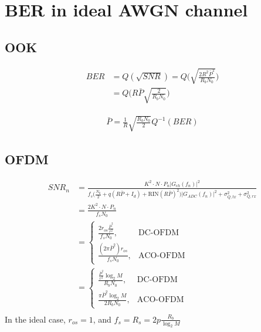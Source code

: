 \documentclass[a4paper]{article}
\begin{document}
\section{BER in ideal AWGN channel}

\subsection{OOK}

\begin{align} \nonumber
BER & = Q(\sqrt{SNR}) = Q\bigg(\sqrt{\frac{2R^2\bar{P}^2}{R_bN_0}}\bigg) \\
&= Q\bigg(R\bar{P}\sqrt{\frac{2}{R_bN_0}}\bigg)
\end{align}


\begin{align}
\bar{P} = \frac{1}{R}\sqrt{\frac{R_bN_0}{2}}Q^{-1}(BER)
\end{align}

\subsection{OFDM}

\begin{align} \nonumber
SNR_n &= \frac{K^2\cdot N\cdot P_n|G_{ch}(f_n)|^2}{f_s\Big(\frac{N_0}{2} + q(R\bar{P} + I_d) + \text{RIN}(R\bar{P})^2\Big)|G_{ADC}(f_n)|^2 + \sigma_{Q, tx}^2 + \sigma_{Q, rx}^2} \\
&= \frac{2K^2\cdot N\cdot P_n}{f_sN_0} \\
&= \begin{cases}
\frac{2r_{os}\frac{\bar{P}^2}{r^2}}{f_sN_0}, &\text{DC-OFDM} \\
\frac{(2\pi\bar{P}^2)r_{os}}{f_sN_0}, &\text{ACO-OFDM}
\end{cases} \\
&= \begin{cases}
\frac{\frac{\bar{P}^2}{r^2}\log_2M}{R_bN_0}, &\text{DC-OFDM} \\
\frac{\pi\bar{P}^2\log_2M}{2R_bN_0}, &\text{ACO-OFDM}
\end{cases} \\
\end{align}
In the ideal case, $r_{os} = 1$, and $f_s = R_s = 2p\frac{R_b}{\log_2 M}$
\end{document}
